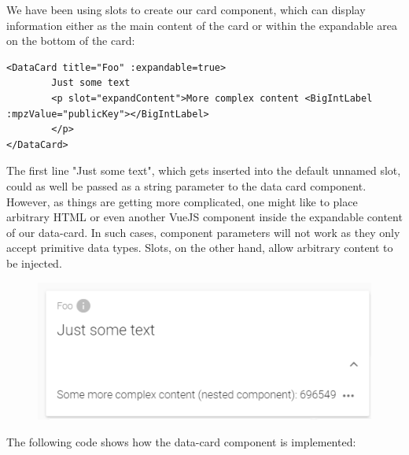 We have been using slots to create our card component, which can display information either as the main content of the card or within the expandable area on the bottom of the card:

\begin{verbatim}
<DataCard title="Foo" :expandable=true>
		Just some text
		<p slot="expandContent">More complex content <BigIntLabel :mpzValue="publicKey"></BigIntLabel>
		</p>
</DataCard>
\end{verbatim}
The first line "{}Just some text"{}, which gets inserted into the default unnamed slot, could as well be passed as a string parameter to the data card component. However, as things are getting more complicated, one might like to place arbitrary HTML or even another VueJS component inside the expandable content of our data-card. In such cases, component parameters will not work as they only accept primitive data types. Slots, on the other hand, allow arbitrary content to be injected.
\begin{figure}[h!]
\begin{center}
\includegraphics[scale=1.0]{assets/datacardexample.PNG}\\
\label{DataCardXample}%
\end{center}
\end{figure}
The following code shows how the data-card component is implemented:

